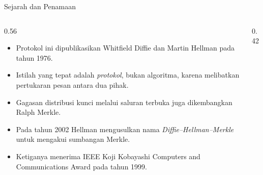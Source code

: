 \documentclass[aspectratio=169,11pt]{beamer}
\begin{document}
\begin{frame}{Sejarah dan Penamaan}
    \begin{columns}[T,onlytextwidth]
        \begin{column}{0.56\textwidth}
            \footnotesize
            \begin{itemize}
                \item Protokol ini dipublikasikan Whitfield Diffie dan
                      Martin Hellman pada tahun 1976.
                \item Istilah yang tepat adalah \emph{protokol}, bukan
                      algoritma, karena melibatkan pertukaran pesan antara
                      dua pihak.
                \item Gagasan distribusi kunci melalui saluran terbuka juga
                      dikembangkan Ralph Merkle.
                \item Pada tahun 2002 Hellman mengusulkan nama
                      \textit{Diffie--Hellman--Merkle} untuk mengakui
                      sumbangan Merkle.
                \item Ketiganya menerima IEEE Koji Kobayashi Computers and
                      Communications Award pada tahun 1999.
            \end{itemize}
        \end{column}
        \begin{column}{0.42\textwidth}
            \centering
        \end{column}
    \end{columns}
\end{frame}
\end{document}
